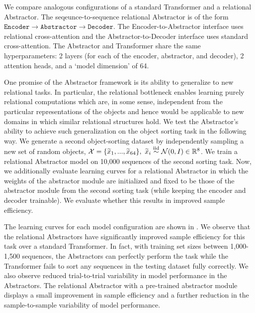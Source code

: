  We compare analogous configurations of a standard Transformer and a relational Abstractor. The seqeunce-to-sequence relational Abstractor is of the form $\texttt{Encoder} \to \texttt{Abstractor} \to \texttt{Decoder}$. The Encoder-to-Abstractor interface uses relational cross-attention and the Abstractor-to-Decoder interface uses standard cross-attention. The Abstractor and Transformer share the same hyperparameters: 2 layers (for each of the encoder, abstractor, and decoder), 2 attention heads, and a `model dimension' of 64.

 One promise of the Abstractor framework is its ability to generalize to new relational tasks. In particular, the relational bottleneck enables learning purely relational computations which are, in some sense, independent from the particular representations of the objects and hence would be applicable to new domains in which similar relational structures hold. We test the Abstractor's ability to achieve such generalization on the object sorting task in the following way. We generate a second object-sorting dataset by independently sampling a new set of random objects, $\mathcal{X} = \{ \widetilde{x}_1 , ..., \widetilde{x}_{64} \}, \ \widetilde{x}_i \overset{\mathrm{iid}}{\sim} \mathcal{N}(0, I) \in \mathbb{R}^8$. We train a relational Abstractor model on 10,000 sequences of the second sorting task. Now, we additionally evaluate learning curves for a relational Abstractor in which the weights of the abstractor module are initialized and fixed to be those of the abstractor module from the second sorting task (while keeping the encoder and decoder trainable). We evaluate whether this results in improved sample efficiency.

The learning curves for each model configuration are shown in . We observe that the relational Abstractors have significantly improved sample efficiency for this task over a standard Transformer. In fact, with training set sizes between 1,000-1,500 sequences, the Abstractors can perfectly perform the task while the Transformer fails to sort any sequences in the testing dataset fully correctly. We also observe reduced trial-to-trial variability in model performance in the Abstractors. The relational Abstractor with a pre-trained abstractor module displays a small improvement in sample efficiency and a further reduction in the sample-to-sample variability of model performance.

